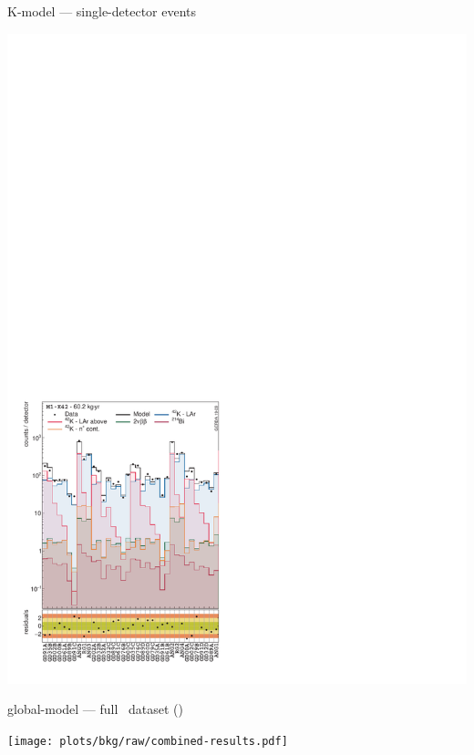 \documentclass[10pt,aspectratio=169]{beamer}
\begin{document}
\begin{frame}{K-model --- single-detector events}
\begin{center}
    \includegraphics[height=0.85\textheight]{plots/bkg/raw/ph2/results/kmodel/kmodel-1d-ds1.pdf}
  \end{center}
\end{frame}
\begin{frame}[plain]{global-model --- full \phasetwo\ dataset (\gexpobkg)}
  \begin{center}
    \texttt{[image: plots/bkg/raw/combined-results.pdf]}
  \end{center}
\end{frame}
\end{document}
